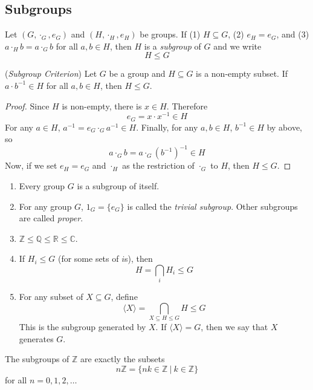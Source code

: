 \documentclass[10pt, a4paper, twoside]{report}
\begin{document}
\subsection{Subgroups}
\begin{definition}
    Let \((G,\cdot_G,e_G)\) and \((H,\cdot_H,e_H)\) be groups. If (1) \(H\subseteq G\), (2) \(e_H=e_G\), and (3) \(a\cdot_H b=a\cdot_G b\) for all \(a,b\in H\), then \(H\) is a \emph{subgroup} of \(G\) and we write
    \[H\leq G\]
\end{definition}
\begin{proposition}
    (\emph{Subgroup Criterion}) Let \(G\) be a group and \(H\subseteq G\) is a non-empty subset. If \(a\cdot b^{-1}\in H\) for all \(a,b\in H\), then \(H\leq G\).
    \begin{proof}
        Since \(H\) is non-empty, there is \(x\in H\). Therefore 
        \[e_G=x\cdot x^{-1}\in H\]
        For any \(a\in H\), \(a^{-1}=e_G\cdot_Ga^{-1}\in H\). Finally, for any \(a,b\in H\), \(b^{-1}\in H\) by above, so 
        \[a\cdot_G b=a\cdot_G(b^{-1})^{-1}\in H\]
        Now, if we set \(e_H=e_G\) and \(\cdot_H\) as the restriction of \(\cdot_G\) to \(H\), then \(H\leq G\).
    \end{proof}
\end{proposition}
\begin{example} \item[] 
    \begin{enumerate}
        \item Every group \(G\) is a subgroup of itself.
        \item For any group \(G\), \(1_G=\{e_G\}\) is called the \emph{trivial subgroup}. Other subgroups are called \emph{proper}.
        \item \(\mathbb{Z}\leq\mathbb{Q}\leq\mathbb{R}\leq\mathbb{C}\).
        \item If \(H_i\leq G\) (for some sets of \(i\)s), then 
        \[H=\bigcap_iH_i\leq G\]
        \item For any subset of \(X\subseteq G\), define 
        \[\langle X\rangle=\bigcap_{X\subseteq H\leq G}H\leq G\]
        This is the subgroup generated by \(X\). If \(\langle X\rangle=G\), then we say that \(X\) generates \(G\).
    \end{enumerate}
\end{example}
\begin{proposition}
    The subgroups of \(\mathbb{Z}\) are exactly the subsets 
    \[n\mathbb{Z}=\{nk\in\mathbb{Z}\:|\:k\in\mathbb{Z}\}\]
    for all \(n=0,1,2,\ldots\)
    \label{prop:nz_subgroup}
\end{proposition}
\end{document}
